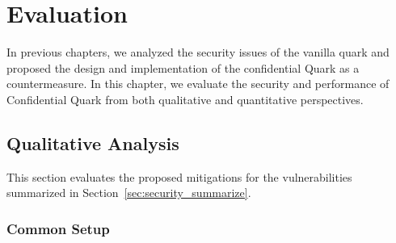 \chapter{Evaluation}
\label{sec:evaluation}

In previous chapters, we analyzed the security issues of the vanilla quark and proposed the design and implementation of the confidential Quark as a countermeasure. In this chapter, we evaluate the security and performance of Confidential Quark from both 
qualitative and quantitative perspectives.

\section{Qualitative Analysis}
\label{sec:eva_qualitativ}
This section evaluates the proposed mitigations for the vulnerabilities summarized in Section~\ref{sec:security_summarize}.

\subsection{Common Setup}



